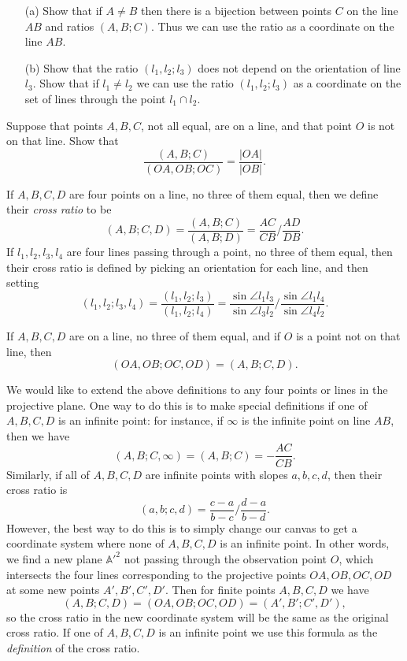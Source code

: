 \begin{exer}
\begin{itemize}
\item[(a)] Show that if $A\ne B$ then there is a bijection between points $C$ on the line $AB$ and ratios $(A,B;C)$. Thus we can use the ratio as a coordinate on the line $AB$.
\item[(b)] Show that the ratio $(l_1,l_2;l_3)$ does not depend on the orientation of line $l_3$. Show that if $l_1 \ne l_2$ we can use the ratio $(l_1,l_2;l_3)$ as a coordinate on the set of lines through the point $l_1\cap l_2$.
\end{itemize}
\end{exer}

\begin{exer}
Suppose that points $A,B,C$, not all equal, are on a line, and that point $O$ is not on that line. Show that
\[
\frac{(A,B;C)}{(OA,OB;OC)} = \frac{|OA|}{|OB|}.
\]
\end{exer}

\begin{defn} If $A,B,C,D$ are four points on a line, no three of them equal, then we define their \emph{cross ratio} to be
\[
(A,B;C,D) = \frac{(A,B;C)}{(A,B;D)} = \frac{AC}{CB}\bigg/\frac{AD}{DB}.
\]
If $l_1,l_2,l_3,l_4$ are four lines passing through a point, no three of them equal, then their cross ratio is defined by picking an orientation for each line, and then setting
\[
(l_1,l_2;l_3,l_4) = \frac{(l_1,l_2;l_3)}{(l_1,l_2;l_4)} = \frac{\sin\angle l_1l_3}{\sin \angle l_3l_2}\bigg/\frac{\sin\angle l_1l_4}{\sin\angle l_4l_2}.
\]
\end{defn}

\begin{thm} If $A,B,C,D$ are on a line, no three of them equal, and if $O$ is a point not on that line, then
\[
(OA,OB;OC,OD) = (A,B;C,D).
\]
\end{thm}

We would like to extend the above definitions to any four points or lines in the projective plane. One way to do this is to make special definitions if one of $A,B,C,D$ is an infinite point: for instance, if $\infty$ is the infinite point on line $AB$, then we have
\[
(A,B;C,\infty) = (A,B;C) = -\frac{AC}{CB}.
\]
Similarly, if all of $A,B,C,D$ are infinite points with slopes $a,b,c,d$, then their cross ratio is
\[
(a,b;c,d) = \frac{c-a}{b-c}\bigg/\frac{d-a}{b-d}.
\]
However, the best way to do this is to simply change our canvas to get a coordinate system where none of $A,B,C,D$ is an infinite point. In other words, we find a new plane $\mathbb{A'}^2$ not passing through the observation point $O$, which intersects the four lines corresponding to the projective points $OA,OB,OC,OD$ at some new points $A',B',C',D'$. Then for finite points $A,B,C,D$ we have
\[
(A,B;C,D) = (OA,OB;OC,OD) = (A',B';C',D'),
\]
so the cross ratio in the new coordinate system will be the same as the original cross ratio. If one of $A,B,C,D$ is an infinite point we use this formula as the \emph{definition} of the cross ratio.

